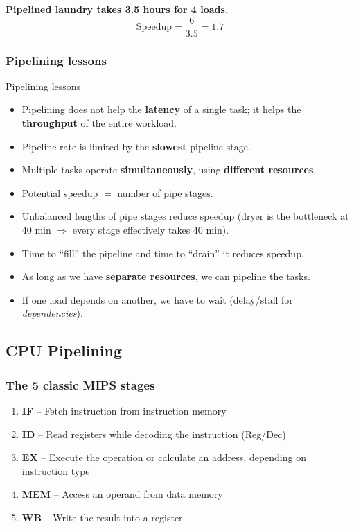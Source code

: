 \begin{remark}
\textbf{Pipelined laundry takes 3.5 hours for 4 loads.}
\[
  \text{Speedup} = \frac{6}{3.5} = 1.7
\]
\end{remark}

\subsubsection{Pipelining lessons}

\begin{noot}{Pipelining lessons}
\begin{itemize}
  \item Pipelining does not help the \textbf{latency} of a single task; it
  helps the \textbf{throughput} of the entire workload.
  \item Pipeline rate is limited by the \textbf{slowest} pipeline stage.
  \item Multiple tasks operate \textbf{simultaneously}, using
  \textbf{different resources}.
  \item Potential speedup $=$ number of pipe stages.
  \item Unbalanced lengths of pipe stages reduce speedup (dryer is the
  bottleneck at 40 min $\Rightarrow$ every stage effectively takes 40 min).
  \item Time to ``fill'' the pipeline and time to ``drain'' it reduces
  speedup.
  \item As long as we have \textbf{separate resources}, we can pipeline the
  tasks.
  \item If one load depends on another, we have to wait (delay/stall for
  \emph{dependencies}).
\end{itemize}
\end{noot}

\subsection{CPU Pipelining}
\label{sec:cpu-pipelining}

\subsubsection{The 5 classic MIPS stages}

\begin{enumerate}
  \item \textbf{IF} -- Fetch instruction from instruction memory
  \item \textbf{ID} -- Read registers while decoding the instruction
  (Reg/Dec)
  \item \textbf{EX} -- Execute the operation or calculate an address,
  depending on instruction type
  \item \textbf{MEM} -- Access an operand from data memory
  \item \textbf{WB} -- Write the result into a register
\end{enumerate}

